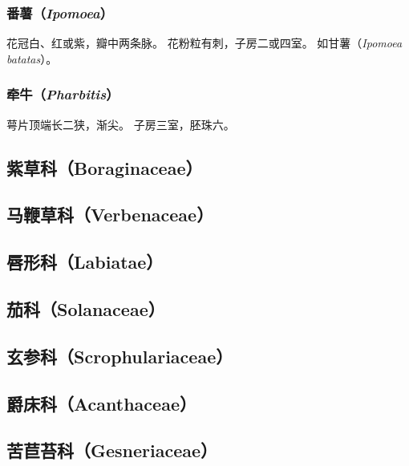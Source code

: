 \documentclass[11pt]{article}
\begin{document}
\begin{sloppypar}
\subsubsection{番薯（\textit{Ipomoea}）}
花冠白、红或紫，瓣中两条脉。
花粉粒有刺，子房二或四室。
如甘薯（\textit{Ipomoea batatas}）。

\subsubsection{牵牛（\textit{Pharbitis}）}
萼片顶端长二狭，渐尖。
子房三室，胚珠六。

\subsection{紫草科（Boraginaceae）}

\subsection{马鞭草科（Verbenaceae）}
\subsection{唇形科（Labiatae）}
\subsection{茄科（Solanaceae）}
\subsection{玄参科（Scrophulariaceae）}
\subsection{爵床科（Acanthaceae）}
\subsection{苦苣苔科（Gesneriaceae）}

\end{sloppypar}
\end{document}
